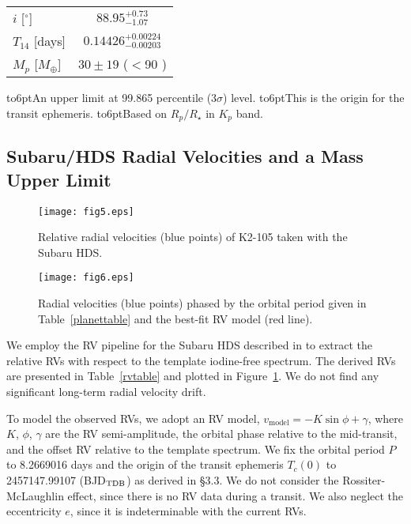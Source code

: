 \documentclass[]{pasj01}
\begin{document}
\begin{table}[tb]
\begin{tabular}{lc}
$i$ [$^\circ$] & $88.95_{-1.07}^{+0.73}$ \\
$T_{14}$ [days] &  $0.14426_{-0.00203}^{+0.00224}$ \\ 
$M_p$ [$M_{\oplus}$] & $30 \pm 19$ ($<$90 \footnotemark[$*$])\\
\hline
\end{tabular}
\begin{tabnote}
\noindent
\hbox to6pt{\footnotemark[$*$]\hss}\unskip An upper limit at 99.865 percentile (3$\sigma$) level.
\hbox to6pt{\footnotemark[$\dagger$]\hss}\unskip This is the origin for the transit ephemeris.
\hbox to6pt{\footnotemark[$\ddagger$]\hss}\unskip Based on $R_p/R_\star$ in $K_p$ band.
\end{tabnote}
\end{table}

\subsection{Subaru/HDS Radial Velocities and a Mass Upper Limit}

	\begin{figure}[tp]
			\texttt{[image: fig5.eps]} 
				\caption{Relative radial velocities (blue points) of K2-105 taken with the Subaru HDS.
				}
			\label{fig_rvjd}
	\end{figure}

	\begin{figure}[tp]
			\texttt{[image: fig6.eps]} 
				\caption{Radial velocities (blue points) phased by the orbital period given in Table~\ref{planettable}
				and the best-fit RV model (red line).
				}
			\label{fig_rvphase}
	\end{figure}

We employ the RV pipeline for the Subaru HDS described in \citet{2002PASJ...54..873S}
to extract the relative RVs with respect to the template iodine-free spectrum.
The derived RVs are presented in Table~\ref{rvtable} and plotted in Figure~\ref{fig_rvjd}.
We do not find any significant long-term radial velocity drift.

To model the observed RVs, we adopt an RV model,
$v_\mathrm{model}=-K \sin \phi+\gamma$, where $K$, $\phi$, $\gamma$ are 
the RV semi-amplitude, the orbital phase relative to the mid-transit,
and the offset RV relative to the template spectrum.
We fix the orbital period $P$ to 8.2669016 days and the origin of the transit ephemeris
$T_c (0)$ to 2457147.99107 (BJD$_{\rm TDB}$) as derived in \S3.3.
We do not consider the Rossiter-McLaughlin effect, since there is no RV data during a transit.
We also neglect the eccentricity $e$, since it is indeterminable with the current RVs.
\end{document}
